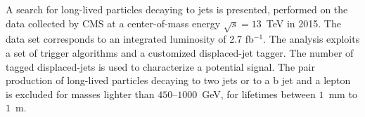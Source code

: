  A search for long-lived particles decaying to jets is
  presented, performed on the data collected by CMS at a
  center-of-mass energy $\sqrt{s}=13$~TeV in 2015. The data set
  corresponds to an integrated luminosity of 2.7 fb$^{-1}$. The analysis
  exploits a set of trigger algorithms and a customized displaced-jet
  tagger.  The number of tagged displaced-jets is used to characterize
  a potential signal.  The pair production of long-lived particles
  decaying to two jets or to a b jet and a lepton is excluded for
  masses lighter than $450$--$1000$~GeV, for lifetimes between
  $1$~mm to $1$~m.

